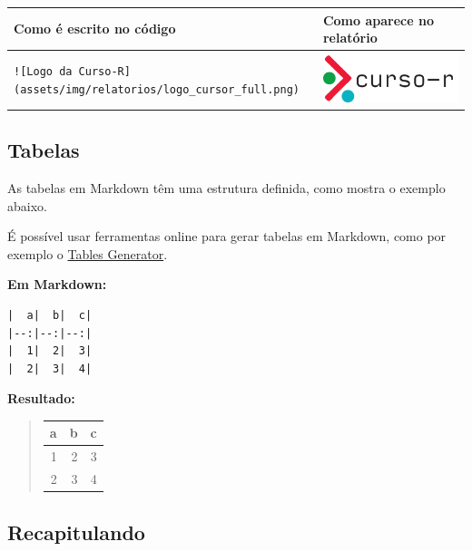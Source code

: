 \documentclass[
]{book}
\begin{document}
\begin{longtable}[]{@{}
  >{\raggedleft\arraybackslash}p{}
  >{\raggedleft\arraybackslash}p{}@{}}
\toprule
Como é escrito no código & Como aparece no relatório \\
\midrule
\endhead
\texttt{!{[}Logo\ da\ Curso-R{]}(assets/img/relatorios/logo\_cursor\_full.png)} & \includegraphics{assets/img/relatorios/logo_cursor_full.png} \\
\bottomrule
\end{longtable}

\hypertarget{tabelas}{%
\subsection{Tabelas}\label{tabelas}}

As tabelas em Markdown têm uma estrutura definida, como mostra o exemplo abaixo.

É possível usar ferramentas online para gerar tabelas em Markdown, como por exemplo o \href{https://www.tablesgenerator.com/markdown_tables}{Tables Generator}.

\textbf{Em Markdown:}

\begin{verbatim}
|  a|  b|  c|
|--:|--:|--:|
|  1|  2|  3|
|  2|  3|  4|
\end{verbatim}

\textbf{Resultado:}

\begin{quote}
\begin{longtable}[]{@{}rrr@{}}
\toprule
a & b & c \\
\midrule
\endhead
1 & 2 & 3 \\
2 & 3 & 4 \\
\bottomrule
\end{longtable}
\end{quote}

\hypertarget{recapitulando}{%
\subsection{Recapitulando}\label{recapitulando}}
\end{document}
